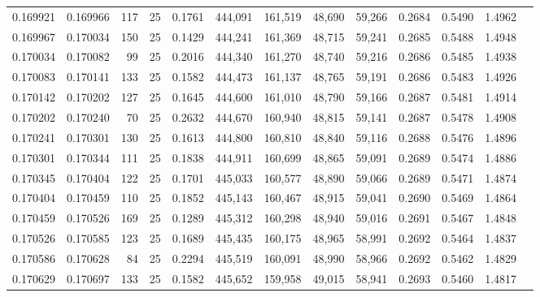 \begin{tabular}{rrrrrrrrrrrrr}
0.169921 & 0.169966 &   117 &  25 &                                     0.1761 & 444,091 & 161,519 &  48,690 &  59,266 & 0.2684 & 0.5490 & 1.4962 \\
0.169967 & 0.170034 &   150 &  25 &                                     0.1429 & 444,241 & 161,369 &  48,715 &  59,241 & 0.2685 & 0.5488 & 1.4948 \\
0.170034 & 0.170082 &    99 &  25 &                                     0.2016 & 444,340 & 161,270 &  48,740 &  59,216 & 0.2686 & 0.5485 & 1.4938 \\
0.170083 & 0.170141 &   133 &  25 &                                     0.1582 & 444,473 & 161,137 &  48,765 &  59,191 & 0.2686 & 0.5483 & 1.4926 \\
0.170142 & 0.170202 &   127 &  25 &                                     0.1645 & 444,600 & 161,010 &  48,790 &  59,166 & 0.2687 & 0.5481 & 1.4914 \\
0.170202 & 0.170240 &    70 &  25 &                                     0.2632 & 444,670 & 160,940 &  48,815 &  59,141 & 0.2687 & 0.5478 & 1.4908 \\
0.170241 & 0.170301 &   130 &  25 &                                     0.1613 & 444,800 & 160,810 &  48,840 &  59,116 & 0.2688 & 0.5476 & 1.4896 \\
0.170301 & 0.170344 &   111 &  25 &                                     0.1838 & 444,911 & 160,699 &  48,865 &  59,091 & 0.2689 & 0.5474 & 1.4886 \\
0.170345 & 0.170404 &   122 &  25 &                                     0.1701 & 445,033 & 160,577 &  48,890 &  59,066 & 0.2689 & 0.5471 & 1.4874 \\
0.170404 & 0.170459 &   110 &  25 &                                     0.1852 & 445,143 & 160,467 &  48,915 &  59,041 & 0.2690 & 0.5469 & 1.4864 \\
0.170459 & 0.170526 &   169 &  25 &                                     0.1289 & 445,312 & 160,298 &  48,940 &  59,016 & 0.2691 & 0.5467 & 1.4848 \\
0.170526 & 0.170585 &   123 &  25 &                                     0.1689 & 445,435 & 160,175 &  48,965 &  58,991 & 0.2692 & 0.5464 & 1.4837 \\
0.170586 & 0.170628 &    84 &  25 &                                     0.2294 & 445,519 & 160,091 &  48,990 &  58,966 & 0.2692 & 0.5462 & 1.4829 \\
0.170629 & 0.170697 &   133 &  25 &                                     0.1582 & 445,652 & 159,958 &  49,015 &  58,941 & 0.2693 & 0.5460 & 1.4817 \\

\end{tabular}
